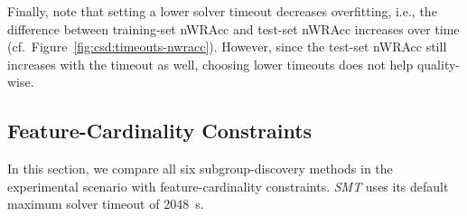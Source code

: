 \documentclass{article}
\theoremstyle{definition}
\begin{document}
Finally, note that setting a lower solver timeout decreases overfitting, i.e., the difference between training-set nWRAcc and test-set nWRAcc increases over time (cf.~Figure~\ref{fig:csd:timeouts-nwracc}).
However, since the test-set nWRAcc still increases with the timeout as well, choosing lower timeouts does not help quality-wise.

\subsection{Feature-Cardinality Constraints}
\label{sec:csd:evaluation:cardinality}

In this section, we compare all six subgroup-discovery methods in the experimental scenario with feature-cardinality constraints.
\emph{SMT} uses its default maximum solver timeout of 2048~s.
\end{document}
